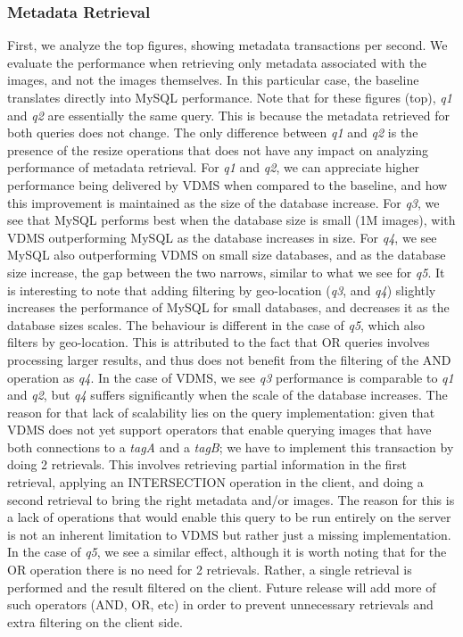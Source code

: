 \subsubsection{Metadata Retrieval}

First, we analyze the top figures, showing metadata transactions per second.
We evaluate the performance when retrieving only metadata associated with the images,
and not the images themselves.
In this particular case, the baseline translates directly into MySQL performance.
Note that for these figures (top), \textit{q1} and \textit{q2} are
essentially the same query. This is because the metadata retrieved for both
queries does not change. The only difference between \textit{q1} and \textit{q2}
is the presence of the resize operations that does not have any impact on
analyzing performance of metadata retrieval.
For \textit{q1} and \textit{q2}, we can appreciate higher performance being delivered by
VDMS when compared to the baseline, and how this improvement is maintained
as the size of the database increase.
For \textit{q3}, we see that MySQL performs best when the database size
is small (1M images), with VDMS outperforming MySQL as the database increases in size.
For \textit{q4}, we see MySQL also outperforming VDMS on small size databases, and as
the database size increase, the gap between the two narrows,
similar to what we see for \textit{q5}.
It is interesting to note that adding filtering by geo-location
(\textit{q3}, and \textit{q4}) slightly increases the performance of MySQL
for small databases, and decreases it as the database sizes scales.
The behaviour is different in the case of \textit{q5},
which also filters by geo-location.
This is attributed to the fact that OR queries involves processing larger results,
and thus does not benefit from the filtering of the AND operation as \textit{q4}.
In the case of VDMS, we see \textit{q3} performance is comparable to \textit{q1}
and \textit{q2}, but \textit{q4} suffers significantly
when the scale of the database increases.
The reason for that lack of scalability lies on the query implementation: given that
VDMS does not yet support operators that enable querying images
that have both connections to a \textit{tagA} and a \textit{tagB};
we have to implement this transaction by doing 2 retrievals.
This involves retrieving partial information in the first retrieval,
applying an INTERSECTION operation in the client, and doing a second retrieval
to bring the right metadata and/or images.
The reason for this is a lack of operations that would enable this query to be
run entirely on the server is not an inherent limitation to VDMS but rather
just a missing implementation.
In the case of \textit{q5}, we see a similar effect, although it is worth noting
that for the OR operation there is no need for 2 retrievals.
Rather, a single retrieval is performed and the result filtered on the client.
Future release will add more of such operators (AND, OR, etc) in order to prevent
unnecessary retrievals and extra filtering on the client side.

